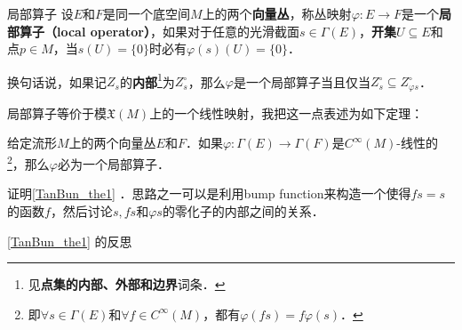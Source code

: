 \begin{definition}{局部算子}
设$E$和$F$是同一个底空间$M$上的两个\textbf{向量丛}，称丛映射$\varphi:E\rightarrow F$是一个\textbf{局部算子（local operator）}，如果对于任意的光滑截面$s\in\Gamma(E)$，\textbf{开集}$U\subseteq E$和点$p\in M$，当$s(U)=\{0\}$时必有$\varphi(s)(U)=\{0\}$．

换句话说，如果记$Z_s$的\textbf{内部}\footnote{见\textbf{点集的内部、外部和边界}词条．}为$Z_s^\circ$，那么$\varphi$是一个局部算子当且仅当$Z_s^\circ\subseteq Z_{\varphi{s}}^\circ$．
\end{definition}

局部算子等价于模$\mathfrak{X}(M)$上的一个线性映射，我把这一点表述为如下定理：

\begin{theorem}{}\label{TanBun_the1}
给定流形$M$上的两个向量丛$E$和$F$．如果$\varphi:\Gamma(E)\rightarrow\Gamma(F)$是$C^\infty(M)$-线性的\footnote{即$\forall s\in\Gamma(E)$和$\forall f\in C^\infty(M)$，都有$\varphi(fs)=f\varphi(s)$．}，那么$\varphi$必为一个局部算子．
\end{theorem}

\begin{exercise}{}
证明\autoref{TanBun_the1} ．思路之一可以是利用bump function来构造一个使得$fs=s$的函数$f$，然后讨论$s, fs$和$\varphi{s}$的零化子的内部之间的关系．
\end{exercise}

\begin{exercise}{\autoref{TanBun_the1} 的反思}

\end{exercise}









